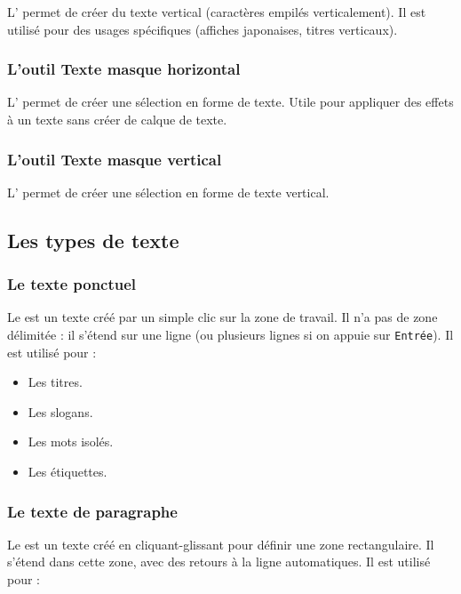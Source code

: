 L' permet de créer du texte vertical (caractères empilés verticalement). Il est utilisé pour des usages spécifiques (affiches japonaises, titres verticaux).

\subsubsection{L'outil Texte masque horizontal}

L' permet de créer une sélection en forme de texte. Utile pour appliquer des effets à un texte sans créer de calque de texte.

\subsubsection{L'outil Texte masque vertical}

L' permet de créer une sélection en forme de texte vertical.

\subsection{Les types de texte}

\subsubsection{Le texte ponctuel}

Le  est un texte créé par un simple clic sur la zone de travail. Il n'a pas de zone délimitée : il s'étend sur une ligne (ou plusieurs lignes si on appuie sur \texttt{Entrée}). Il est utilisé pour :

\begin{itemize}
    \item Les titres.
    \item Les slogans.
    \item Les mots isolés.
    \item Les étiquettes.
\end{itemize}

\subsubsection{Le texte de paragraphe}

Le  est un texte créé en cliquant-glissant pour définir une zone rectangulaire. Il s'étend dans cette zone, avec des retours à la ligne automatiques. Il est utilisé pour :

